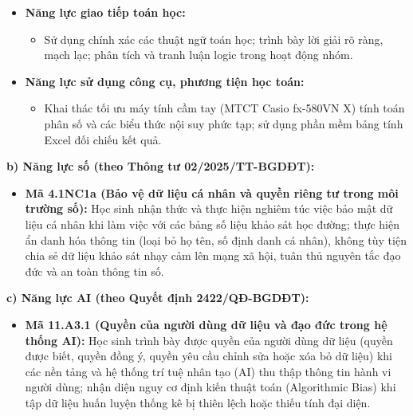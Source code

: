 \documentclass[12pt, a4paper]{article}
\begin{document}
\begin{itemize}[leftmargin=1.5em]
    \begin{itemize}
        \item Vận dụng các số đặc trưng đo xu thế trung tâm vào các bài toán phân tích thực tế: so sánh kết quả học tập của học sinh, năng suất lao động của các dây chuyền sản xuất, chỉ số thể lực học đường.
    \end{itemize}
    \item \textbf{Năng lực giao tiếp toán học:}
    \begin{itemize}
        \item Sử dụng chính xác các thuật ngữ toán học; trình bày lời giải rõ ràng, mạch lạc; phân tích và tranh luận logic trong hoạt động nhóm.
    \end{itemize}
    \item \textbf{Năng lực sử dụng công cụ, phương tiện học toán:}
    \begin{itemize}
        \item Khai thác tối ưu máy tính cầm tay (MTCT Casio fx-580VN X) tính toán phân số và các biểu thức nội suy phức tạp; sử dụng phần mềm bảng tính Excel đối chiếu kết quả.
    \end{itemize}
\end{itemize}

\textbf{b) Năng lực số (theo Thông tư 02/2025/TT-BGDĐT):}
\begin{itemize}[leftmargin=1.5em]
    \item \textbf{Mã 4.1NC1a (Bảo vệ dữ liệu cá nhân và quyền riêng tư trong môi trường số):} Học sinh nhận thức và thực hiện nghiêm túc việc bảo mật dữ liệu cá nhân khi làm việc với các bảng số liệu khảo sát học đường; thực hiện ẩn danh hóa thông tin (loại bỏ họ tên, số định danh cá nhân), không tùy tiện chia sẻ dữ liệu khảo sát nhạy cảm lên mạng xã hội, tuân thủ nguyên tắc đạo đức và an toàn thông tin số.
\end{itemize}

\textbf{c) Năng lực AI (theo Quyết định 2422/QĐ-BGDĐT):}
\begin{itemize}[leftmargin=1.5em]
    \item \textbf{Mã 11.A3.1 (Quyền của người dùng dữ liệu và đạo đức trong hệ thống AI):} Học sinh trình bày được quyền của người dùng dữ liệu (quyền được biết, quyền đồng ý, quyền yêu cầu chỉnh sửa hoặc xóa bỏ dữ liệu) khi các nền tảng và hệ thống trí tuệ nhân tạo (AI) thu thập thông tin hành vi người dùng; nhận diện nguy cơ định kiến thuật toán (Algorithmic Bias) khi tập dữ liệu huấn luyện thống kê bị thiên lệch hoặc thiếu tính đại diện.
\end{itemize}
\end{document}
